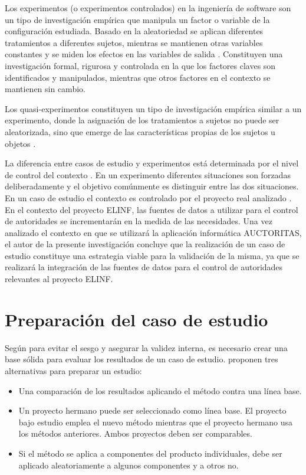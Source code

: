 Los experimentos (o experimentos controlados) en la ingeniería de software son un tipo de investigación empírica que manipula un factor o variable de la configuración estudiada. Basado en la aleatoriedad se aplican diferentes tratamientos a diferentes sujetos, mientras se mantienen otras variables constantes y se miden los efectos en las variables de salida \citep{Wohlin2012}. Constituyen una investigación formal, rigurosa y controlada en la que los factores claves son identificados y manipulados, mientras que otros factores en el contexto se mantienen sin cambio.

Los quasi-experimentos constituyen un tipo de investigación empírica similar a un experimento, donde la asignación de los tratamientos a sujetos no puede ser aleatorizada, sino que emerge de las características propias de los sujetos u objetos \citep{Wohlin2012}. 

La diferencia entre casos de estudio y experimentos está determinada por el nivel de control del contexto \citep{Petersen:2009:CIS:1671248.1671293}. En un experimento diferentes situaciones son forzadas deliberadamente y el objetivo comúnmente es distinguir entre las dos situaciones. En un caso de estudio el contexto es controlado por el proyecto real analizado \citep{Wohlin2012}. En el contexto del proyecto ELINF, las fuentes de datos a utilizar para el control de autoridades se incrementarán en la medida de las necesidades. Una vez analizado el contexto en que se utilizará la aplicación informática AUCTORITAS, el autor de la presente investigación concluye que la realización de un caso de estudio constituye una estrategia viable para la validación de la misma, ya que se realizará la integración de las fuentes de datos para el control de autoridades relevantes al proyecto ELINF. 

\section{Preparación del caso de estudio}
Según \cite{kitchenham1995case} para evitar el sesgo y asegurar la validez interna, es necesario crear una base sólida para evaluar los resultados de un caso de estudio. \cite{kitchenham1995case} proponen tres alternativas para preparar un estudio:

\begin{itemize}
\item Una comparación de los resultados aplicando el método contra una línea base.
\item Un proyecto hermano puede ser seleccionado como línea base. El proyecto bajo estudio emplea el nuevo método mientras que el proyecto hermano usa los métodos anteriores. Ambos proyectos deben ser comparables.
\item Si el método se aplica a componentes del producto individuales, debe ser aplicado aleatoriamente a algunos componentes y a otros no.
\end{itemize}

